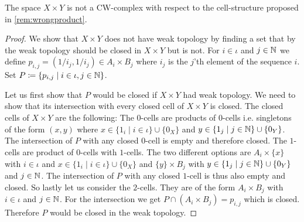 \begin{lem}
    The space $X \times Y$ is not a CW-complex with respect to the cell-structure proposed in \ref{rem:wrongproduct}.
\end{lem}
\begin{proof}
    We show that $X \times Y$ does not have weak topology by finding a set that by the weak topology should be closed in $X \times Y$ but is not. 
    For $i \in \iota$ and $j \in \mathbb{N}$ we define $p_{i,j} = (1/i_j, 1 /i_j) \in A_i \times B_j$ where $i_j$ is the $j$'th element of the sequence $i$.
    Set $P \coloneq \{ p_{i, j} \mid i \in \iota, j \in \mathbb{N}\}$.
    
    Let us first show that $P$ would be closed if $X \times Y$ had weak topology. We need to show that its intersection with every closed cell of $X \times Y$ is closed.
    The closed cells of $X \times Y$ are the following: 
    The $0$-cells are products of $0$-cells i.e. singletons of the form $(x, y)$ where $x \in \{1_i \mid i \in \iota\} \cup \{0_X\}$ and $y \in \{1_j \mid j \in \mathbb{N}\} \cup \{0_Y\}$. The intersection of $P$ with any closed $0$-cell is empty and therefore closed. 
    The $1$-cells are product of $0$-cells with $1$-cells. The two different options are $A_i \times \{x\}$ with $i \in \iota$ and $x \in \{1_i \mid i \in \iota\} \cup \{0_X\}$ and $\{y\} \times B_j$ with $y \in \{1_j \mid j \in \mathbb{N}\} \cup \{0_Y\}$ and $j \in \mathbb{N}$. The intersection of $P$ with any closed $1$-cell is thus also empty and closed. 
    So lastly let us consider the $2$-cells. They are of the form $A_i \times B_j$ with $i \in \iota$ and $j \in \mathbb{N}$. For the intersection we get $P \cap (A_i \times B_j) = p_{i, j}$ which is closed. 
    Therefore $P$ would be closed in the weak topology. 


\end{proof}
